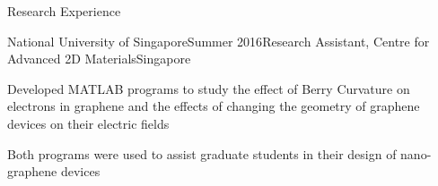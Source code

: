 \documentclass{resume2} %
\begin{document}
\begin{rSection}{Research Experience}
\begin{rSubsection}{National University of Singapore}{Summer 2016}{Research Assistant, Centre for Advanced 2D Materials}{Singapore}
	\item Developed MATLAB programs to study the effect of Berry Curvature on electrons in graphene and the effects of changing the geometry of graphene devices on their electric fields 
	\item Both programs were used to assist graduate students in their design of nano-graphene devices
\end{rSubsection}
\iffalse
	\begin{rSubsection}{Nanyang Technological University}{Summer 2015}{Research Assistant, Polymeric Biomaterials Group}{Singapore}
	\item Involved in the biodegradable heart stent project where nanoparticles of varying sizes and composition were added to different kinds of polymers to increase their mechanical properties
	\item Conducted experiments using Instrom tensile tester, ultrasonicator, microcompounder and thermogravimetric analysis to characterize the nanoparticle enhanced polymer materials
	\end{rSubsection}
\fi
\end{rSection}

\end{document}
